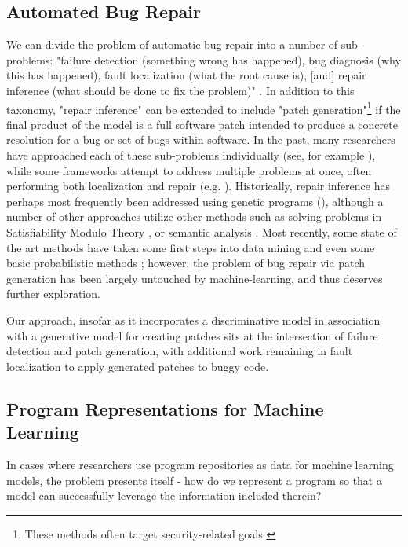 \documentclass[sigconf]{acmart}
\begin{document}
\subsection{Automated Bug Repair}
\label{sec:auto_bugrep}
We can divide the problem of automatic bug repair into a number of sub-problems: "failure detection (something wrong has happened), bug diagnosis (why this has happened), fault localization (what the root cause is), [and] repair inference (what should be done to fix the problem)" \cite{monperrus2014critical}. In addition to this taxonomy, "repair inference" can be extended to include "patch generation"\footnote{These methods often target security-related goals \cite{cui2007shieldgen,sidiroglou2005countering}} if the final product of the model is a full software patch intended to produce a concrete resolution for a bug or set of bugs within software. In the past, many researchers have approached each of these sub-problems individually (see, for example \cite{monperrus2015automatic,dallmeier2007extraction,kim2006automatic,liu2005sober,lukins2010bug}), while some frameworks attempt to address multiple problems at once, often performing both localization and repair (e.g. \cite{long2016automatic}). Historically, repair inference has perhaps most frequently been addressed using genetic programs (\cite{forrest2009genetic,arcuri2008novel,le2012genprog,le2013automatic,weimer2010automatic,kim2013automatic}), although a number of other approaches utilize other methods such as solving problems in Satisfiability Modulo Theory  \cite{demarco2014automatic,xuan2017nopol}, or semantic analysis \cite{nguyen2013semfix}. Most recently, some state of the art methods have taken some first steps into data mining \cite{le2016history} and even some basic probabilistic methods \cite{long2016automatic}; however, the problem of bug repair via patch generation has been largely untouched by machine-learning, and thus deserves further exploration.

Our approach, insofar as it incorporates a discriminative model in association with a generative model for creating patches sits at the intersection of failure detection and patch generation, with additional work remaining in fault localization to apply generated patches to buggy code.

\subsection{Program Representations for Machine Learning}
\label{sec:programreb}
 In cases where researchers use program repositories as data for machine learning models, the problem presents itself - how do we represent a program so that a model can successfully leverage the information included therein? %
 
\end{document}
